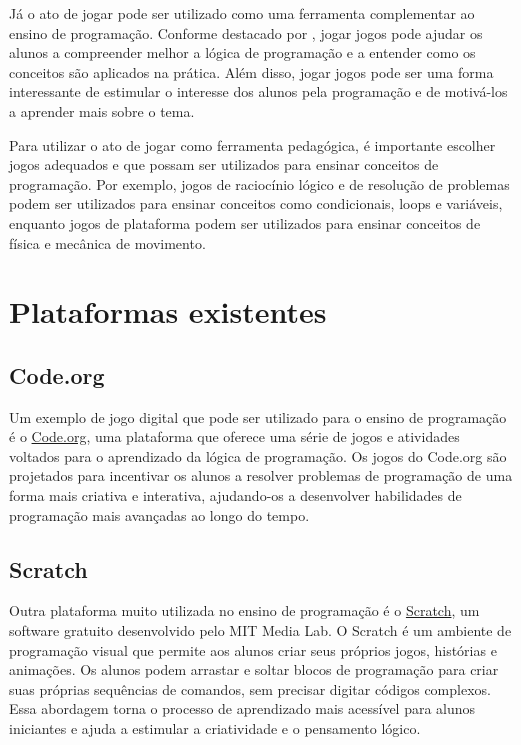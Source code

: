 Já o ato de jogar pode ser utilizado como uma ferramenta complementar ao ensino de programação. Conforme destacado por , jogar jogos pode ajudar os alunos a compreender melhor a lógica de programação e a entender como os conceitos são aplicados na prática. Além disso, jogar jogos pode ser uma forma interessante de estimular o interesse dos alunos pela programação e de motivá-los a aprender mais sobre o tema.

Para utilizar o ato de jogar como ferramenta pedagógica, é importante escolher jogos adequados e que possam ser utilizados para ensinar conceitos de programação. Por exemplo, jogos de raciocínio lógico e de resolução de problemas podem ser utilizados para ensinar conceitos como condicionais, loops e variáveis, enquanto jogos de plataforma podem ser utilizados para ensinar conceitos de física e mecânica de movimento.

\section{Plataformas existentes}

\subsection{Code.org}

Um exemplo de jogo digital que pode ser utilizado para o ensino de programação é o \href{https://code.org/}{Code.org}, uma plataforma que oferece uma série de jogos e atividades voltados para o aprendizado da lógica de programação. Os jogos do Code.org são projetados para incentivar os alunos a resolver problemas de programação de uma forma mais criativa e interativa, ajudando-os a desenvolver habilidades de programação mais avançadas ao longo do tempo.

\subsection{Scratch}

Outra plataforma muito utilizada no ensino de programação é o \href{https://scratch.mit.edu/}{Scratch}, um software gratuito desenvolvido pelo MIT Media Lab. O Scratch é um ambiente de programação visual que permite aos alunos criar seus próprios jogos, histórias e animações. Os alunos podem arrastar e soltar blocos de programação para criar suas próprias sequências de comandos, sem precisar digitar códigos complexos. Essa abordagem torna o processo de aprendizado mais acessível para alunos iniciantes e ajuda a estimular a criatividade e o pensamento lógico.

